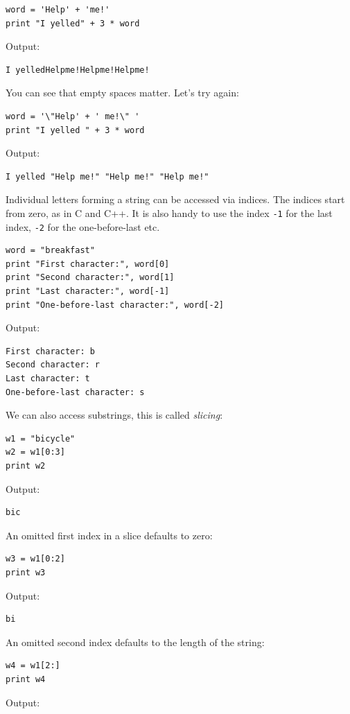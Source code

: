 \documentclass[article,A4,12pt]{llncs}
\begin{document}
\begin{verbatim}
word = 'Help' + 'me!'
print "I yelled" + 3 * word
\end{verbatim}
Output:

\begin{verbatim}
I yelledHelpme!Helpme!Helpme!
\end{verbatim}
You can see that empty spaces matter. Let's try again:

\begin{verbatim}
word = '\"Help' + ' me!\" '
print "I yelled " + 3 * word
\end{verbatim}
Output:

\begin{verbatim}
I yelled "Help me!" "Help me!" "Help me!"
\end{verbatim}
Individual letters forming a string can be accessed via indices. The indices 
start from zero, as in C and C++. It is also handy to use the index {\tt -1} 
for the last index, {\tt -2} for the one-before-last etc.


\begin{verbatim}
word = "breakfast"
print "First character:", word[0]
print "Second character:", word[1]
print "Last character:", word[-1]
print "One-before-last character:", word[-2]
\end{verbatim}
Output:

\begin{verbatim}
First character: b
Second character: r
Last character: t
One-before-last character: s
\end{verbatim}
We can also access substrings, this is called {\em slicing}:

\begin{verbatim}
w1 = "bicycle"
w2 = w1[0:3]
print w2
\end{verbatim}
Output:

\begin{verbatim}
bic
\end{verbatim}
An omitted first index in a slice defaults to zero:

\begin{verbatim}
w3 = w1[0:2]
print w3
\end{verbatim}
Output:

\begin{verbatim}
bi
\end{verbatim}
An omitted second index defaults to the length of the string:

\begin{verbatim}
w4 = w1[2:]
print w4
\end{verbatim}
Output:
\end{document}
